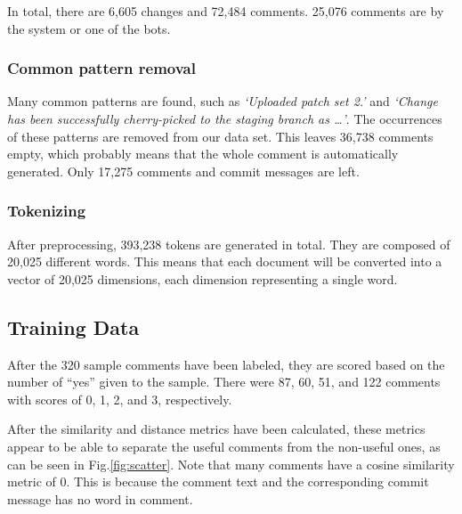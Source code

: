 \documentclass[conference]{IEEEtran}
\begin{document}
In total, there are 6,605 changes and 72,484 comments. 25,076 comments are by the system or one of the bots.

\subsubsection{Common pattern removal}

Many common patterns are found, such as \emph{`Uploaded patch set 2.'} and \emph{`Change has been successfully cherry-picked to the staging branch as \dots'}.
The occurrences of these patterns are removed from our data set.
This leaves 36,738 comments empty, which probably means that the whole comment is automatically generated.
Only 17,275 comments and commit messages are left.

\subsubsection{Tokenizing}

After preprocessing, 393,238 tokens are generated in total. They are composed of 20,025 different words.
This means that each document will be converted into a vector of 20,025 dimensions, each dimension representing a single word.



\subsection{Training Data}

After the 320 sample comments have been labeled,
they are scored based on the number of ``yes'' given to the sample.
There were 87, 60, 51, and 122 comments with scores of 0, 1, 2, and 3, respectively.

After the similarity and distance metrics have been calculated,
these metrics appear to be able to separate the useful comments from the non-useful ones,
as can be seen in Fig.\ref{fig:scatter}.
Note that many comments have a cosine similarity metric of 0.
This is because the comment text and the corresponding commit message has no word in comment.
\end{document}
